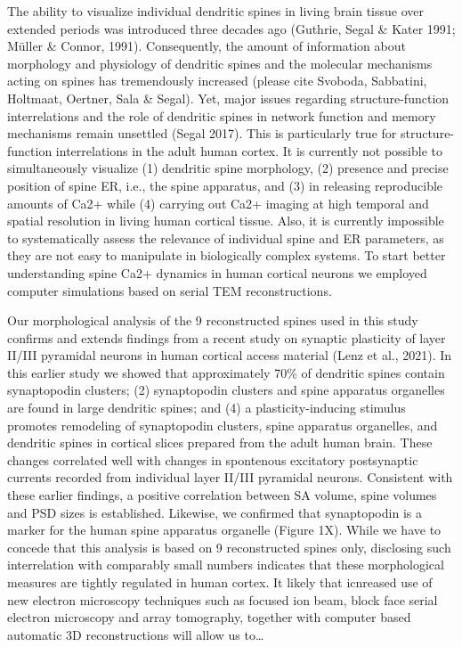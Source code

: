 \documentclass[fleqn,12pt]{wlscirep}
\begin{document}
	The ability to visualize individual dendritic spines in living brain tissue over extended periods was introduced three decades ago (Guthrie, Segal \& Kater 1991; Müller \& Connor, 1991). Consequently, the amount of information about morphology and physiology of dendritic spines and the molecular mechanisms acting on spines has tremendously increased (please cite Svoboda, Sabbatini, Holtmaat, Oertner, Sala \& Segal). Yet, major issues regarding structure-function interrelations and the role of dendritic spines in network function and memory mechanisms remain unsettled (Segal 2017). This is particularly true for structure-function interrelations in the adult human cortex. It is currently not possible to simultaneously visualize (1) dendritic spine morphology, (2) presence and precise position of spine ER, i.e., the spine apparatus, and (3) in releasing reproducible amounts of Ca2+ while (4) carrying out Ca2+ imaging at high temporal and spatial resolution in living human cortical tissue. Also, it is currently impossible to systematically assess the relevance of individual spine and ER parameters, as they are not easy to manipulate in biologically complex systems. To start better understanding spine Ca2+ dynamics in human cortical neurons we employed computer simulations based on serial TEM reconstructions.

	Our morphological analysis of the 9 reconstructed spines used in this study confirms and extends findings from a recent study on synaptic plasticity of layer II/III pyramidal neurons in human cortical access material (Lenz et al., 2021). In this earlier study we showed that approximately 70\% of dendritic spines contain synaptopodin clusters; (2) synaptopodin clusters and spine apparatus organelles are found in large dendritic spines; and (4) a plasticity-inducing stimulus promotes remodeling of synaptopodin clusters, spine apparatus organelles, and dendritic spines in cortical slices prepared from the adult human brain. These changes correlated well with changes in spontenous excitatory postsynaptic currents recorded from individual layer II/III pyramidal neurons. Consistent with these earlier findings, a positive correlation between SA volume, spine volumes and PSD sizes is established. Likewise, we confirmed that synaptopodin is a marker for the human spine apparatus organelle (Figure 1X). While we have to concede that this analysis is based on 9 reconstructed spines only, disclosing such interrelation with comparably small numbers indicates that these morphological measures are tightly regulated in human cortex. It likely that icnreased use of new electron microscopy techniques such as focused ion beam, block face serial electron microscopy and array tomography, together with computer based automatic 3D reconstructions will allow us to…
\end{document}
